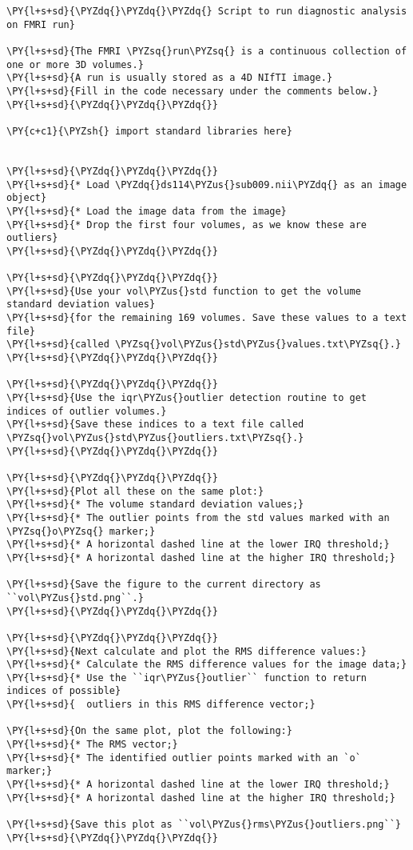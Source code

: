 \begin{Verbatim}[commandchars=\\\{\}]
\PY{l+s+sd}{\PYZdq{}\PYZdq{}\PYZdq{} Script to run diagnostic analysis on FMRI run}

\PY{l+s+sd}{The FMRI \PYZsq{}run\PYZsq{} is a continuous collection of one or more 3D volumes.}
\PY{l+s+sd}{A run is usually stored as a 4D NIfTI image.}
\PY{l+s+sd}{Fill in the code necessary under the comments below.}
\PY{l+s+sd}{\PYZdq{}\PYZdq{}\PYZdq{}}

\PY{c+c1}{\PYZsh{} import standard libraries here}


\PY{l+s+sd}{\PYZdq{}\PYZdq{}\PYZdq{}}
\PY{l+s+sd}{* Load \PYZdq{}ds114\PYZus{}sub009.nii\PYZdq{} as an image object}
\PY{l+s+sd}{* Load the image data from the image}
\PY{l+s+sd}{* Drop the first four volumes, as we know these are outliers}
\PY{l+s+sd}{\PYZdq{}\PYZdq{}\PYZdq{}}

\PY{l+s+sd}{\PYZdq{}\PYZdq{}\PYZdq{}}
\PY{l+s+sd}{Use your vol\PYZus{}std function to get the volume standard deviation values}
\PY{l+s+sd}{for the remaining 169 volumes. Save these values to a text file}
\PY{l+s+sd}{called \PYZsq{}vol\PYZus{}std\PYZus{}values.txt\PYZsq{}.}
\PY{l+s+sd}{\PYZdq{}\PYZdq{}\PYZdq{}}

\PY{l+s+sd}{\PYZdq{}\PYZdq{}\PYZdq{}}
\PY{l+s+sd}{Use the iqr\PYZus{}outlier detection routine to get indices of outlier volumes.}
\PY{l+s+sd}{Save these indices to a text file called \PYZsq{}vol\PYZus{}std\PYZus{}outliers.txt\PYZsq{}.}
\PY{l+s+sd}{\PYZdq{}\PYZdq{}\PYZdq{}}

\PY{l+s+sd}{\PYZdq{}\PYZdq{}\PYZdq{}}
\PY{l+s+sd}{Plot all these on the same plot:}
\PY{l+s+sd}{* The volume standard deviation values;}
\PY{l+s+sd}{* The outlier points from the std values marked with an \PYZsq{}o\PYZsq{} marker;}
\PY{l+s+sd}{* A horizontal dashed line at the lower IRQ threshold;}
\PY{l+s+sd}{* A horizontal dashed line at the higher IRQ threshold;}

\PY{l+s+sd}{Save the figure to the current directory as ``vol\PYZus{}std.png``.}
\PY{l+s+sd}{\PYZdq{}\PYZdq{}\PYZdq{}}

\PY{l+s+sd}{\PYZdq{}\PYZdq{}\PYZdq{}}
\PY{l+s+sd}{Next calculate and plot the RMS difference values:}
\PY{l+s+sd}{* Calculate the RMS difference values for the image data;}
\PY{l+s+sd}{* Use the ``iqr\PYZus{}outlier`` function to return indices of possible}
\PY{l+s+sd}{  outliers in this RMS difference vector;}

\PY{l+s+sd}{On the same plot, plot the following:}
\PY{l+s+sd}{* The RMS vector;}
\PY{l+s+sd}{* The identified outlier points marked with an `o` marker;}
\PY{l+s+sd}{* A horizontal dashed line at the lower IRQ threshold;}
\PY{l+s+sd}{* A horizontal dashed line at the higher IRQ threshold;}

\PY{l+s+sd}{Save this plot as ``vol\PYZus{}rms\PYZus{}outliers.png``}
\PY{l+s+sd}{\PYZdq{}\PYZdq{}\PYZdq{}}
\end{Verbatim}

